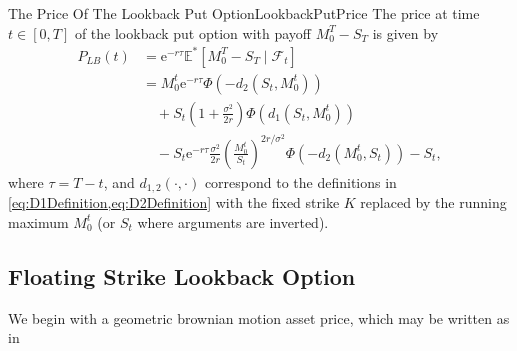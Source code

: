 \begin{prop}{The Price Of The Lookback Put Option}{LookbackPutPrice}
	The price at time \(t \in [0,T]\) of the lookback put option with payoff \(M_0^T - S_T\) is given by
	\begin{align} \label{eq:LookbackPutPrice}
		P_{LB}(t) & = \mathrm{e}^{-r\tau} \mathbb{E}^\ast \left[ M_0^T - S_T \mid \mathcal{F}_t \right] \nonumber                                                             \\
		          & = M_0^t \mathrm{e}^{-r\tau} \Phi \left( -d_2\left(S_t, M_0^t\right) \right) \nonumber                                                                     \\
		          & \quad + S_t \left( 1 + \frac{\sigma^2}{2r} \right) \Phi \left( d_1\left(S_t, M_0^t\right) \right) \nonumber                                               \\
		          & \quad - S_t \mathrm{e}^{-r\tau} \frac{\sigma^2}{2r} \left( \frac{M_0^t}{S_t} \right)^{2r/\sigma^2} \Phi \left( -d_2\left(M_0^t, S_t\right) \right) - S_t,
	\end{align}
	where \(\tau = T-t\), and \(d_{1,2}(\cdot, \cdot)\) correspond to the definitions in \cref{eq:D1Definition,eq:D2Definition} with the fixed strike \(K\) replaced by the running maximum \(M_0^t\) (or \(S_t\) where arguments are inverted).
\end{prop}

\subsection{Floating Strike Lookback Option}

We begin with a geometric brownian motion asset price, which may be written as in
